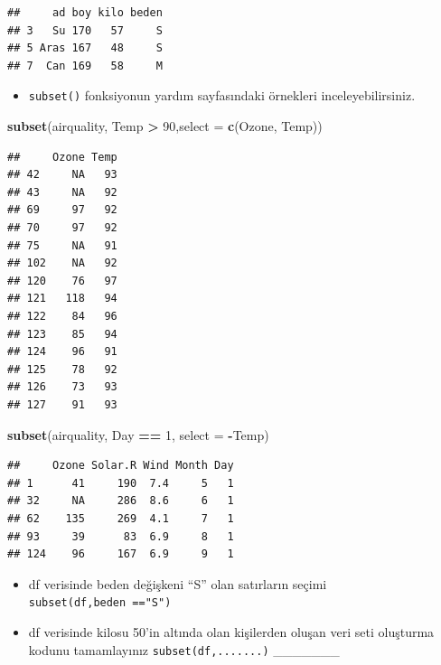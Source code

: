 \documentclass[
  oneside]{book}
\newenvironment{Shaded}{\begin{snugshade}}{\end{snugshade}}
\newcommand{\AttributeTok}[1]{\textcolor[rgb]{0.13,0.29,0.53}{#1}}
\newcommand{\DecValTok}[1]{\textcolor[rgb]{0.00,0.00,0.81}{#1}}
\newcommand{\FunctionTok}[1]{\textcolor[rgb]{0.13,0.29,0.53}{\textbf{#1}}}
\newcommand{\NormalTok}[1]{#1}
\newcommand{\SpecialCharTok}[1]{\textcolor[rgb]{0.81,0.36,0.00}{\textbf{#1}}}
\providecommand{\tightlist}{%
  \setlength{\itemsep}{0pt}\setlength{\parskip}{0pt}}
\begin{document}
\begin{verbatim}
##     ad boy kilo beden
## 3   Su 170   57     S
## 5 Aras 167   48     S
## 7  Can 169   58     M
\end{verbatim}

\begin{itemize}
\tightlist
\item
  \texttt{subset()} fonksiyonun yardım sayfasındaki örnekleri inceleyebilirsiniz.
\end{itemize}

\begin{Shaded}
\begin{Highlighting}[]
\FunctionTok{subset}\NormalTok{(airquality, Temp }\SpecialCharTok{\textgreater{}} \DecValTok{90}\NormalTok{,}\AttributeTok{select =} \FunctionTok{c}\NormalTok{(Ozone, Temp))}
\end{Highlighting}
\end{Shaded}

\begin{verbatim}
##     Ozone Temp
## 42     NA   93
## 43     NA   92
## 69     97   92
## 70     97   92
## 75     NA   91
## 102    NA   92
## 120    76   97
## 121   118   94
## 122    84   96
## 123    85   94
## 124    96   91
## 125    78   92
## 126    73   93
## 127    91   93
\end{verbatim}

\begin{Shaded}
\begin{Highlighting}[]
\FunctionTok{subset}\NormalTok{(airquality, Day }\SpecialCharTok{==} \DecValTok{1}\NormalTok{, }\AttributeTok{select =} \SpecialCharTok{{-}}\NormalTok{Temp)}
\end{Highlighting}
\end{Shaded}

\begin{verbatim}
##     Ozone Solar.R Wind Month Day
## 1      41     190  7.4     5   1
## 32     NA     286  8.6     6   1
## 62    135     269  4.1     7   1
## 93     39      83  6.9     8   1
## 124    96     167  6.9     9   1
\end{verbatim}

\begin{itemize}
\item
  df verisinde beden değişkeni ``S'' olan satırların seçimi \texttt{subset(df,beden\ =="S")}
\item
  df verisinde kilosu 50'in altında olan kişilerden oluşan veri seti oluşturma kodunu tamamlayınız \texttt{subset(df,.......)} \_\_\_\_\_\_\_
\end{itemize}
\end{document}
